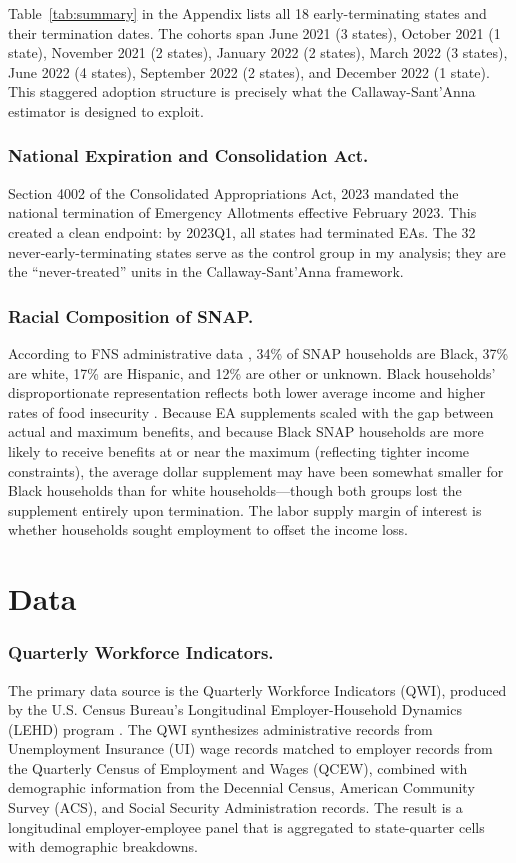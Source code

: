 \documentclass[12pt]{article}
\begin{document}
Table~\ref{tab:summary} in the Appendix lists all 18 early-terminating states and their termination dates. The cohorts span June 2021 (3 states), October 2021 (1 state), November 2021 (2 states), January 2022 (2 states), March 2022 (3 states), June 2022 (4 states), September 2022 (2 states), and December 2022 (1 state). This staggered adoption structure is precisely what the Callaway-Sant'Anna estimator is designed to exploit.

\subsubsection*{National Expiration and Consolidation Act.} Section 4002 of the Consolidated Appropriations Act, 2023 mandated the national termination of Emergency Allotments effective February 2023. This created a clean endpoint: by 2023Q1, all states had terminated EAs. The 32 never-early-terminating states serve as the control group in my analysis; they are the ``never-treated'' units in the Callaway-Sant'Anna framework.

\subsubsection*{Racial Composition of SNAP.} According to FNS administrative data , 34\% of SNAP households are Black, 37\% are white, 17\% are Hispanic, and 12\% are other or unknown. Black households' disproportionate representation reflects both lower average income and higher rates of food insecurity . Because EA supplements scaled with the gap between actual and maximum benefits, and because Black SNAP households are more likely to receive benefits at or near the maximum (reflecting tighter income constraints), the average dollar supplement may have been somewhat smaller for Black households than for white households---though both groups lost the supplement entirely upon termination. The labor supply margin of interest is whether households sought employment to offset the income loss.

\section{Data}

\subsubsection*{Quarterly Workforce Indicators.} The primary data source is the Quarterly Workforce Indicators (QWI), produced by the U.S. Census Bureau's Longitudinal Employer-Household Dynamics (LEHD) program . The QWI synthesizes administrative records from Unemployment Insurance (UI) wage records matched to employer records from the Quarterly Census of Employment and Wages (QCEW), combined with demographic information from the Decennial Census, American Community Survey (ACS), and Social Security Administration records. The result is a longitudinal employer-employee panel that is aggregated to state-quarter cells with demographic breakdowns.
\end{document}
